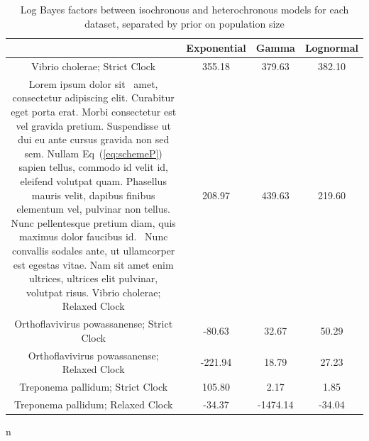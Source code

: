 \documentclass[11pt]{article}
\begin{document}
\begin{itemize}
\begin{center}
        \end{center}
        \begin{table}[H]
        \caption{Log Bayes factors between isochronous and heterochronous models for each dataset, separated by prior on population size}
        \begin{center}
        \begin{tabular}{ c | c c c }
         & Exponential & Gamma & Lognormal \\ 
        \hline
        Vibrio cholerae; Strict Clock & 355.18 & 379.63 & 382.10 \\  Lorem ipsum dolor sit~\cite{bib1} amet, consectetur adipiscing elit. Curabitur eget porta erat. Morbi consectetur est vel gravida pretium. Suspendisse ut dui eu ante cursus gravida non sed sem. Nullam Eq~(\ref{eq:schemeP}) sapien tellus, commodo id velit id, eleifend volutpat quam. Phasellus mauris velit, dapibus finibus elementum vel, pulvinar non tellus. Nunc pellentesque pretium diam, quis maximus dolor faucibus id.~\cite{bib2} Nunc convallis sodales ante, ut ullamcorper est egestas vitae. Nam sit amet enim ultrices, ultrices elit pulvinar, volutpat risus.
        Vibrio cholerae; Relaxed Clock & 208.97 & 439.63 & 219.60 \\   
        Orthoflavivirus powassanense; Strict Clock & -80.63 & 32.67 & 50.29 \\  
        Orthoflavivirus powassanense; Relaxed Clock & -221.94 & 18.79  & 27.23 \\   
        Treponema pallidum; Strict Clock & 105.80 & 2.17 & 1.85 \\  
        Treponema pallidum; Relaxed Clock & -34.37 & -1474.14 & -34.04
        \end{tabular}n
        \end{center}
        \end{table}
    

\end{itemize}
\end{document}
